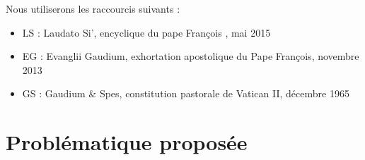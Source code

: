 
\begin{comment}
  \paragraph{Instructions - } A rendre avant le 15 juin
30 pages;
bibliographie critique de chaque livre, probalématique et méthode.
Se concentrer sur un auteur : Laudato Si’
  
\end{comment}



Nous utiliserons les raccourcis suivants : 
\begin{itemize}
    \item LS : Laudato Si', encyclique du pape François \cite{francois_laudato_2015}, mai 2015
    \item EG : Evanglii Gaudium, exhortation apostolique du Pape François, novembre 2013
    \item GS : Gaudium \& Spes, constitution pastorale de Vatican II, décembre 1965
\end{itemize}
\section{Problématique proposée} 

 

